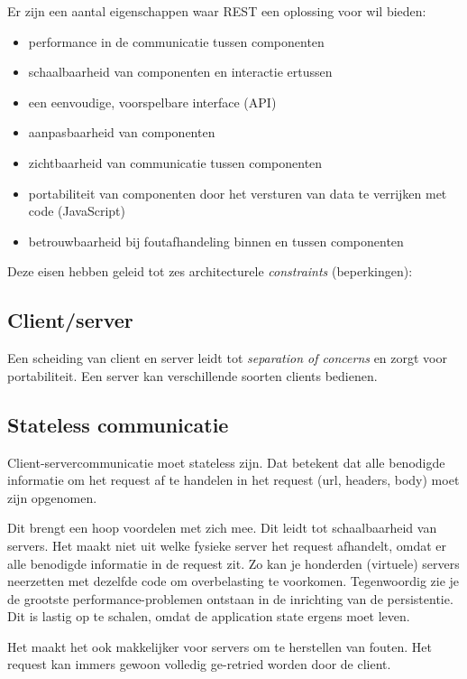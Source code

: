 Er zijn een aantal eigenschappen waar REST een oplossing voor wil 
bieden:
\begin{itemize}
    \item performance in de communicatie tussen componenten
    \item schaalbaarheid van componenten en interactie ertussen
    \item een eenvoudige, voorspelbare interface (API)
    \item aanpasbaarheid van componenten
    \item zichtbaarheid van communicatie tussen componenten
    \item portabiliteit van componenten door het versturen van data te verrijken met code (JavaScript)
    \item betrouwbaarheid bij foutafhandeling binnen en tussen componenten
\end{itemize}

Deze eisen hebben geleid tot zes architecturele \textit{constraints} (beperkingen):

\subsection{Client/server}
Een scheiding van client en server leidt tot \textit{separation of concerns} en 
zorgt voor portabiliteit. Een server kan verschillende soorten clients bedienen.

\subsection{Stateless communicatie}
Client-servercommunicatie moet stateless zijn. 
Dat betekent dat alle benodigde informatie om het request af te handelen in het request (url, headers, body) moet zijn opgenomen.

Dit brengt een hoop voordelen met zich mee. Dit leidt tot schaalbaarheid
van servers. Het maakt niet uit welke fysieke server het request afhandelt,
omdat er alle benodigde informatie in de request zit. Zo kan je honderden (virtuele) 
servers neerzetten met dezelfde code om overbelasting te voorkomen.
Tegenwoordig zie je de grootste performance-problemen ontstaan in de 
inrichting van de persistentie. Dit is lastig op te schalen, 
omdat de application state ergens moet leven.

Het maakt het ook makkelijker voor servers om te herstellen van fouten.
Het request kan immers gewoon volledig ge-retried worden door de client.

